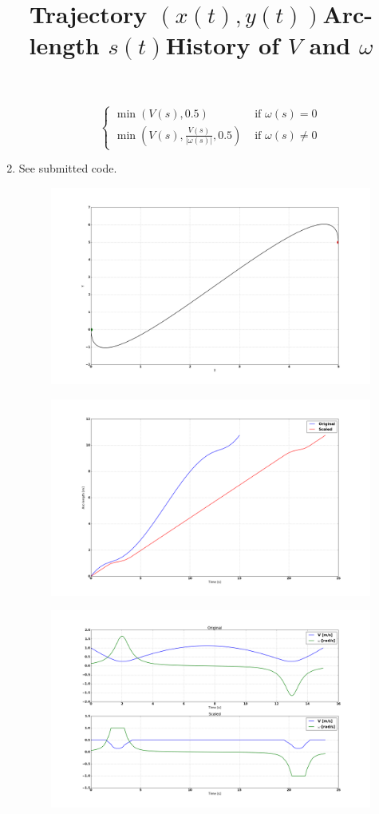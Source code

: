 \documentclass[12pt]{article}
\begin{document}
\begin{enumerate}
\[\begin{cases}
			\min(V(s), 0.5) & \mbox{ if } \omega(s) = 0 \\
			\min\left(V(s), \frac{V(s)}{|\omega(s)|}, 0.5\right) & \mbox{ if } \omega(s) \neq 0
		\end{cases}
	\]
	\item See submitted code.
		\begin{figure}[H]
			\centering
			\title{\bf Trajectory $(x(t), y(t))$}
			\includegraphics[width=\textwidth]{../Figures/hw1_2_iv_a.png}
		\end{figure}
		\begin{figure}[H]
			\centering
			\title{\bf Arc-length $s(t)$}
			\includegraphics[width=\textwidth]{../Figures/hw1_2_iv_b.png}
		\end{figure}
		\begin{figure}[H]
			\centering
			\title{\bf History of $V$ and $\omega$}
			\includegraphics[width=\textwidth]{../Figures/hw1_2_iv_c.png}

\end{figure}
\end{enumerate}
\end{document}
